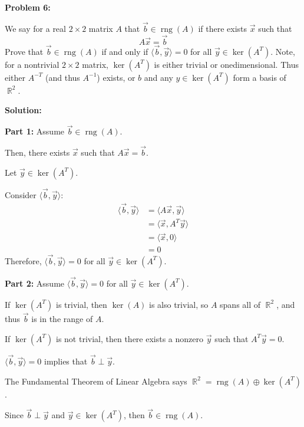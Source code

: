 \documentclass[12pt]{article}
\DeclareMathOperator{\RR}{\mathbb{R}}
\DeclareMathOperator{\rng}{rng}
\newenvironment{problem}[1]{
    \textbf{Problem #1:}
}{
    \rmfamily \vspace{1em}
}
\newenvironment{solution}{
    \textbf{Solution:}
    
}{
    
    \vspace{2em}
}
\begin{document}
\begin{problem}{6}
    We say for a real \(2 \times 2\) matrix \(A\) that \(\vec{b} \in \rng(A)\) if there exists \(\vec{x}\) such
    that
    \[
        A\vec{x} = \vec{b}
    \]
    Prove that \(\vec{b} \in \rng(A)\) if and only if \(\langle \vec{b}, \vec{y} \rangle = 0\) for all \(\vec{y} \in \ker(A^T)\).
    Note, for a nontrivial \(2 \times 2\) matrix, \(\ker(A^T)\) is either trivial or onedimensional. Thus either \(A^{-T}\) (and thus \(A^{-1}\)) exists, or \(b\) and any
    \(y \in \ker(A^T)\) form a basis of \(\RR^2\).
\end{problem}

\begin{solution}
    \textbf{Part 1:} Assume \(\vec{b} \in \rng(A)\).

    Then, there exists \(\vec{x}\) such that \(A\vec{x} = \vec{b}\).

    Let \(\vec{y} \in \ker(A^T)\).

    Consider \(\langle \vec{b}, \vec{y} \rangle\):
    \[
        \begin{aligned}
            \langle \vec{b}, \vec{y} \rangle &= \langle A\vec{x}, \vec{y} \rangle\\
            &= \langle \vec{x}, A^T\vec{y} \rangle\\
            &= \langle \vec{x}, 0 \rangle\\
            &= 0
        \end{aligned}
    \]
    Therefore, \(\langle \vec{b}, \vec{y} \rangle = 0\) for all \(\vec{y} \in \ker(A^T)\).

    \textbf{Part 2:} Assume \(\langle \vec{b}, \vec{y} \rangle = 0\) for all \(\vec{y} \in \ker(A^T)\).

    If \(\ker(A^T)\) is trivial, then \(\ker(A)\) is also trivial, so \(A\) spans all of \(\RR^2\), and thus \(\vec{b}\) is in the range of \(A\).

    If \(\ker(A^T)\) is not trivial, then there exists a nonzero \(\vec{y}\) such that \(A^T\vec{y} = 0\).

    \(\langle \vec{b}, \vec{y} \rangle = 0\) implies that \(\vec{b} \perp \vec{y}\).

    The Fundamental Theorem of Linear Algebra says \(\RR^2 = \rng(A) \oplus \ker(A^T)\).

    Since \(\vec{b} \perp \vec{y}\) and \(\vec{y} \in \ker(A^T)\), then \(\vec{b} \in \rng(A)\).    
\end{solution}
\end{document}
